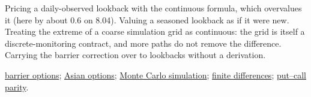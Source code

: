 \begin{qfmethod}
 Pricing a daily-observed lookback with the continuous formula, which overvalues it (here by about 0.6 on 8.04). Valuing a seasoned lookback as if it were new. Treating the extreme of a coarse simulation grid as continuous: the grid is itself a discrete-monitoring contract, and more paths do not remove the difference. Carrying the barrier correction over to lookbacks without a derivation.

 \hyperref[meth:barrier-option-valuation]{barrier options}; \hyperref[meth:asian-option-valuation]{Asian options}; \hyperref[meth:monte-carlo-simulation]{Monte Carlo simulation}; \hyperref[meth:finite-difference-option-pricing]{finite differences}; \hyperref[res:put-call-forward-parity]{put--call parity}.

\end{qfmethod}

